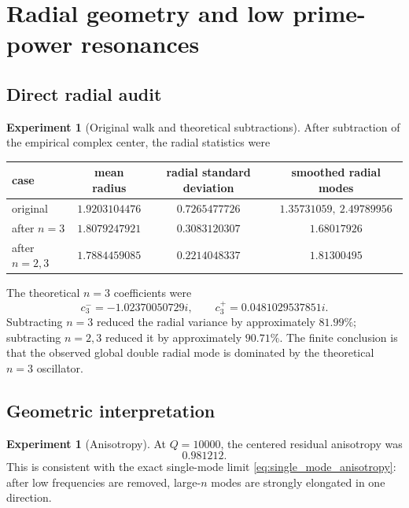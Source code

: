 \documentclass[11pt]{amsart}
\numberwithin{equation}{section}
\theoremstyle{plain}
\theoremstyle{definition}
\newtheorem{experiment}[theorem]{Experiment}
\theoremstyle{remark}
\newcommand{\1}{\mathbf{1}}
\begin{document}
\section{Radial geometry and low prime-power resonances}
\label{sec:numerical_radial_geometry}

\subsection{Direct radial audit}
\label{subsec:direct_radial_audit}

\begin{experiment}[Original walk and theoretical subtractions]
\label{exp:direct_radial_audit_detailed}
After subtraction of the empirical complex center, the radial statistics
were
\begin{center}
\begin{tabular}{lccc}
\toprule
case & mean radius & radial standard deviation & smoothed radial modes\\
\midrule
original & $1.9203104476$ & $0.7265477726$ & $1.35731059,\ 2.49789956$\\
after $n=3$ & $1.8079247921$ & $0.3083120307$ & $1.68017926$\\
after $n=2,3$ & $1.7884459085$ & $0.2214048337$ & $1.81300495$\\
\bottomrule
\end{tabular}
\end{center}
The theoretical $n=3$ coefficients were
\begin{equation}
c_3^-=-1.02370050729i,
\qquad
c_3^+=0.0481029537851i.
\label{eq:numerical_c3_coefficients_detailed}
\end{equation}
Subtracting $n=3$ reduced the radial variance by approximately
$81.99\%$; subtracting $n=2,3$ reduced it by approximately $90.71\%$.
The finite conclusion is that the observed global double radial mode is
dominated by the theoretical $n=3$ oscillator.
\end{experiment}

\subsection{Geometric interpretation}
\label{subsec:numerical_geometric_interpretation}

\begin{experiment}[Anisotropy]
\label{exp:numerical_anisotropy}
At $Q=10000$, the centered residual anisotropy was
\begin{equation}
0.981212.
\label{eq:numerical_anisotropy_value}
\end{equation}
This is consistent with the exact single-mode limit
\eqref{eq:single_mode_anisotropy}: after low frequencies are removed,
large-$n$ modes are strongly elongated in one direction.
\end{experiment}
\end{document}
